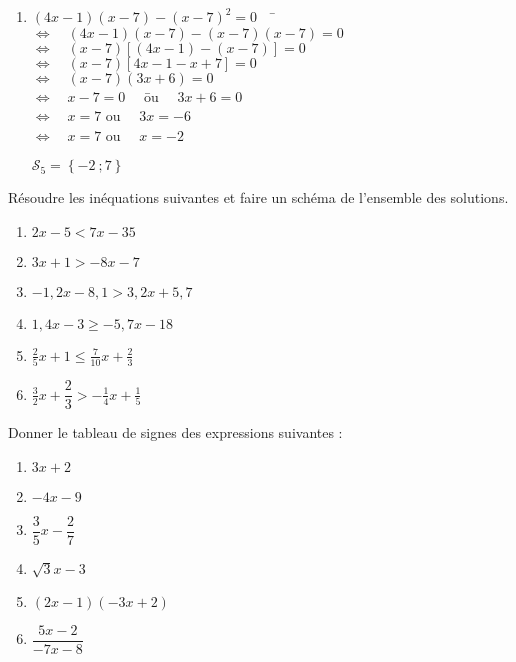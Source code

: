 \documentclass[a4paper,11pt,exos]{nsi} %
\begin{document}
\begin{enumerate}
    \item \begin{tabbing}
        $(4x-1)(x-7)-(x-7)^2=0 \quad$   \= $\iff\quad (4x-1)(x-7)-(x-7)(x-7)=0$\\
        \>  $\iff\quad (x-7)\left[(4x-1)-(x-7)\right]=0$\\
        \>  $\iff\quad (x-7)\left[4x-1-x+7\right]=0$\\
        \>  $\iff\quad (x-7)(3x+6)=0$\\
        \>  $\iff\quad x-7=0\quad$    \= ou $\quad 3x+6=0$\\
        \>  $\iff\quad x=7$  \> ou $\quad 3x=-6$\\
        \>  $\iff\quad x=7$ \> ou $\quad x=-2$
    \end{tabbing}
    $\mathcal{S}_5=\left\{-2\ ; 7\right\} $
\end{enumerate}

\begin {exercice}
Résoudre les inéquations suivantes et faire un schéma de l'ensemble des solutions.
\begin{multicols}{2}
	\begin{enumerate}
		\item 	$2x-5<7x-35$
		\item 	$3x+1 > -8x -7$
		\item 	$-1,2x-8,1>3,2x+5,7$
		\item 	$1,4x-3\geqslant-5,7x-18$
		\item	$\displaystyle\frac{2}{5}x+1\leqslant\frac{7}{10}x+\frac{2}{3}$
		\item	$\displaystyle\frac{3}{2}x+\dfrac{2}{3}>-\frac{1}{4}x+\frac{1}{5}$
	\end{enumerate}
\end{multicols}
\end {exercice}

\begin {exercice}
Donner le tableau de signes des expressions suivantes :
\begin{multicols}{2}
	\begin{enumerate}
		\item 	$3x+2$
		\item 	$-4x-9$
		\item 	$\dfrac{3}{5}x-\dfrac{2}{7}$
		\item 	$\sqrt{3}x-3$
		\item 	$(2x-1)(-3x+2)$
		\item	$\dfrac{5x-2}{-7x-8}$
	\end{enumerate}
\end{multicols}\ \\[-2em]
\end {exercice}
\end{document}
